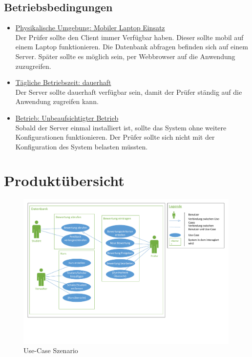 \documentclass[a4paper,listof=leveldown,listof=numbered]{scrreprt}
\begin{document}
	\section{Betriebsbedingungen}
	\begin{itemize}
	\item \underline{Physikalische Umgebung: Mobiler Laptop Einsatz} \\
	Der Prüfer sollte den Client immer Verfügbar haben. Dieser sollte mobil auf einem Laptop funktionieren. Die Datenbank abfragen befinden sich auf einem Server. Später sollte es möglich sein, per Webbrowser auf die Anwendung zuzugreifen.
	
	\item \underline{Tägliche Betriebszeit: dauerhaft} \\
	Der Server sollte dauerhaft verfügbar sein, damit der Prüfer ständig auf die Anwendung zugreifen kann. 
	
	\item \underline{Betrieb: Unbeaufsichtigter Betrieb} \\
	Sobald der Server einmal installiert ist, sollte das System ohne weitere Konfigurationen funktionieren. Der Prüfer sollte sich nicht mit der Konfiguration des System belasten müssten. 
	
	\end{itemize}
	
\chapter{Produktübersicht}
	\begin{figure}[H]
		\centering
		\includegraphics[width=0.99\textwidth]{../Use_Case.pdf}
		\caption{Use-Case Szenario}
	\end{figure}
\end{document}
